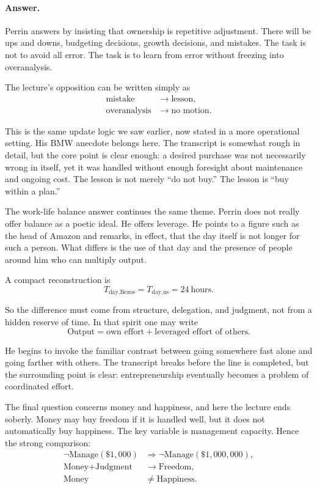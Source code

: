\paragraph{Answer.} Perrin answers by insisting that ownership is repetitive adjustment. There will be ups and downs, budgeting decisions, growth decisions, and mistakes. The task is not to avoid all error. The task is to learn from error without freezing into overanalysis.

The lecture's opposition can be written simply as
\begin{align}
\text{mistake} &\to \text{lesson},\\
\text{overanalysis} &\to \text{no motion}.
\end{align}

This is the same update logic we saw earlier, now stated in a more operational setting. His BMW anecdote belongs here. The transcript is somewhat rough in detail, but the core point is clear enough: a desired purchase was not necessarily wrong in itself, yet it was handled without enough foresight about maintenance and ongoing cost. The lesson is not merely ``do not buy.'' The lesson is ``buy within a plan.''

The work-life balance answer continues the same theme. Perrin does not really offer balance as a poetic ideal. He offers leverage. He points to a figure such as the head of Amazon and remarks, in effect, that the day itself is not longer for such a person. What differs is the use of that day and the presence of people around him who can multiply output.

A compact reconstruction is
\begin{equation}
T_{\text{day,Bezos}} = T_{\text{day,us}} = 24\ \text{hours}.
\end{equation}

So the difference must come from structure, delegation, and judgment, not from a hidden reserve of time. In that spirit one may write
\begin{equation}
\text{Output} = \text{own effort} + \text{leveraged effort of others}.
\end{equation}

He begins to invoke the familiar contrast between going somewhere fast alone and going farther with others. The transcript breaks before the line is completed, but the surrounding point is clear: entrepreneurship eventually becomes a problem of coordinated effort.

The final question concerns money and happiness, and here the lecture ends soberly. Money may buy freedom if it is handled well, but it does not automatically buy happiness. The key variable is management capacity. Hence the strong comparison:
\begin{align}
\neg \text{Manage}(\$1{,}000) &\Rightarrow \neg \text{Manage}(\$1{,}000{,}000),\\
\text{Money} + \text{Judgment} &\to \text{Freedom},\\
\text{Money} &\neq \text{Happiness}.
\end{align}

